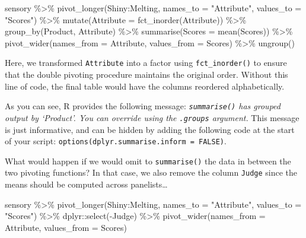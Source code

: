 \documentclass[
]{krantz}
\makeatletter
\newenvironment{Shaded}{\begin{snugshade}}{\end{snugshade}}
\newcommand{\AttributeTok}[1]{\textcolor[rgb]{0.61,0.61,0.61}{#1}}
\newcommand{\FunctionTok}[1]{\textcolor[rgb]{0,0,0}{#1}}
\newcommand{\NormalTok}[1]{#1}
\newcommand{\SpecialCharTok}[1]{\textcolor[rgb]{0,0,0}{#1}}
\newcommand{\StringTok}[1]{\textcolor[rgb]{0.5,0.5,0.5}{#1}}
\renewenvironment{quote}{\begin{VF}}{\end{VF}}
\newenvironment{kframe}{%
\medskip{}
\setlength{\fboxsep}{.8em}
 \def\at@end@of@kframe{}%
 \ifinner\ifhmode%
  \def\at@end@of@kframe{\end{minipage}}%
  \begin{minipage}{\columnwidth}%
 \fi\fi%
 \def\FrameCommand##1{\hskip\@totalleftmargin \hskip-\fboxsep
 \colorbox{shadecolor}{##1}\hskip-\fboxsep
     \hskip-\linewidth \hskip-\@totalleftmargin \hskip\columnwidth}%
 \MakeFramed {\advance\hsize-\width
   \@totalleftmargin\z@ \linewidth\hsize
   \@setminipage}}%
 {\par\unskip\endMakeFramed%
 \at@end@of@kframe}
\renewenvironment{Shaded}{\begin{kframe}}{\end{kframe}}
\makeatother
\begin{document}
\begin{Shaded}
\begin{Highlighting}[]
\NormalTok{sensory }\SpecialCharTok{\%\textgreater{}\%}
  \FunctionTok{pivot\_longer}\NormalTok{(Shiny}\SpecialCharTok{:}\NormalTok{Melting, }
               \AttributeTok{names\_to =} \StringTok{"Attribute"}\NormalTok{, }\AttributeTok{values\_to =} \StringTok{"Scores"}\NormalTok{) }\SpecialCharTok{\%\textgreater{}\%}
  \FunctionTok{mutate}\NormalTok{(}\AttributeTok{Attribute =} \FunctionTok{fct\_inorder}\NormalTok{(Attribute)) }\SpecialCharTok{\%\textgreater{}\%}
  \FunctionTok{group\_by}\NormalTok{(Product, Attribute) }\SpecialCharTok{\%\textgreater{}\%}
  \FunctionTok{summarise}\NormalTok{(}\AttributeTok{Scores =} \FunctionTok{mean}\NormalTok{(Scores)) }\SpecialCharTok{\%\textgreater{}\%}
  \FunctionTok{pivot\_wider}\NormalTok{(}\AttributeTok{names\_from =}\NormalTok{ Attribute, }\AttributeTok{values\_from =}\NormalTok{ Scores) }\SpecialCharTok{\%\textgreater{}\%}
  \FunctionTok{ungroup}\NormalTok{()}
\end{Highlighting}
\end{Shaded}

Here, we transformed \texttt{Attribute} into a factor using \texttt{fct\_inorder()} to ensure that the double pivoting procedure maintains the original order. Without this line of code, the final table would have the columns reordered alphabetically.

\begin{quote}
As you can see, R provides the following message: \emph{\texttt{summarise()} has grouped output by `Product'. You can override using the \texttt{.groups} argument.} This message is just informative, and can be hidden by adding the following code at the start of your script: \texttt{options(dplyr.summarise.inform\ =\ FALSE)}.
\end{quote}

What would happen if we would omit to \texttt{summarise()} the data in between the two pivoting functions? In that case, we also remove the column \texttt{Judge} since the means should be computed across panelists\ldots{}

\begin{Shaded}
\begin{Highlighting}[]
\NormalTok{sensory }\SpecialCharTok{\%\textgreater{}\%}
  \FunctionTok{pivot\_longer}\NormalTok{(Shiny}\SpecialCharTok{:}\NormalTok{Melting, }
               \AttributeTok{names\_to =} \StringTok{"Attribute"}\NormalTok{, }\AttributeTok{values\_to =} \StringTok{"Scores"}\NormalTok{) }\SpecialCharTok{\%\textgreater{}\%}
\NormalTok{  dplyr}\SpecialCharTok{::}\FunctionTok{select}\NormalTok{(}\SpecialCharTok{{-}}\NormalTok{Judge) }\SpecialCharTok{\%\textgreater{}\%}
  \FunctionTok{pivot\_wider}\NormalTok{(}\AttributeTok{names\_from =}\NormalTok{ Attribute, }\AttributeTok{values\_from =}\NormalTok{ Scores)}
\end{Highlighting}
\end{Shaded}
\end{document}
